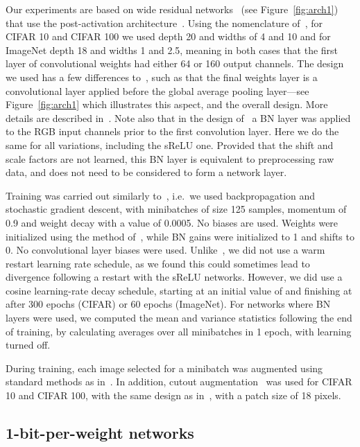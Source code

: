 \documentclass[conference]{IEEEtran}
\begin{document}
Our experiments are based on wide residual networks~\cite{Zagoruyko.16} (see Figure~\ref{fig:arch1}) that use  the post-activation architecture~\cite{He.16}. Using the nomenclature of~\cite{Zagoruyko.16}, for CIFAR 10 and CIFAR 100 we used depth 20 and widths of 4 and 10 and for ImageNet depth 18 and widths 1 and 2.5,  meaning in both cases that the first layer of convolutional weights had either 64  or 160 output channels. The design we used has a few differences to~\cite{Zagoruyko.16}, such as that the final weights layer is a  convolutional layer applied before the global average pooling layer---see Figure~\ref{fig:arch1} which illustrates this aspect, and the overall design. More details are described in~\cite{McDonnell.18}. Note also that in the design of~\cite{McDonnell.18} a BN layer was applied to the RGB input channels prior to  the first convolution layer. Here we do the same for all variations, including the sReLU one. Provided that the shift and scale factors are not learned, this BN layer is equivalent to preprocessing raw data, and does not need to be considered to form a network layer. 






Training was carried out similarly to~\cite{McDonnell.18}, i.e.~we used backpropagation and stochastic gradient descent, with minibatches of size 125 samples, momentum of 0.9 and weight decay with a value of 0.0005. No biases are used. Weights were initialized using the method of~\cite{He.15}, while BN gains were initialized to 1 and shifts to 0. No convolutional layer biases were used. Unlike~\cite{McDonnell.18}, we did not use a warm restart learning rate schedule, as we found this could sometimes lead to divergence following a restart with the sReLU networks. However, we did use a cosine learning-rate decay schedule, starting at an initial value of  and finishing at  after 300 epochs (CIFAR) or 60 epochs (ImageNet). For networks where BN layers were used, we computed the mean and variance statistics following the end of training, by calculating averages over all minibatches in 1 epoch, with learning turned off.


During training, each image selected for a minibatch was augmented using standard methods as in~\cite{McDonnell.18}.  In addition, cutout augmentation~\cite{Devries.17} was used for CIFAR 10 and CIFAR 100, with the same design as in~\cite{McDonnell.18},  with a patch size of 18 pixels.

\subsection{1-bit-per-weight networks}
\end{document}
